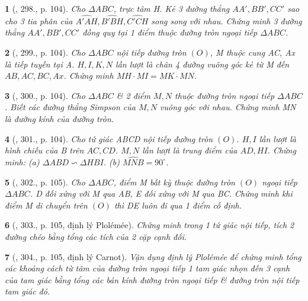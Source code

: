 \documentclass{article}
\newtheorem{baitoan}{}
\begin{document}
\begin{baitoan}[\cite{Binh_Toan_9_tap_2}, 298., p. 104]
	Cho $\Delta ABC$, trực tâm H. Kẻ 3 đường thẳng $AA',BB',CC'$ sao cho 3 tia phân của $\widehat{A'AH},\widehat{B'BH},\widehat{C'CH}$ song song với nhau. Chứng minh 3 đường thẳng $AA',BB',CC'$ đồng quy tại 1 điểm thuộc đường tròn ngoại tiếp $\Delta ABC$.
\end{baitoan}

\begin{baitoan}[\cite{Binh_Toan_9_tap_2}, 299., p. 104]
	Cho $\Delta ABC$ nội tiếp đường tròn $(O)$, M thuộc cung AC, Ax là tiếp tuyến tại A. $H,I,K,N$ lần lượt là chân 4 đường vuông góc kẻ từ M đến $AB,AC,BC,Ax$. Chứng minh $MH\cdot MI = MK\cdot MN$.
\end{baitoan}

\begin{baitoan}[\cite{Binh_Toan_9_tap_2}, 300., p. 104]
	Cho $\Delta ABC$ \& 2 điểm $M,N$ thuộc đường tròn ngoại tiếp $\Delta ABC$. Biết các đường thẳng Simpson của $M,N$ vuông góc với nhau. Chứng minh MN là đường kính của đường tròn.
\end{baitoan}

\begin{baitoan}[\cite{Binh_Toan_9_tap_2}, 301., p. 104]
	Cho tứ giác ABCD nội tiếp đường tròn $(O)$. $H,I$ lần lượt là hình chiếu của B trên $AC,CD$. $M,N$ lần lượt là trung điểm của $AD,HI$. Chứng minh: (a) $\Delta ABD\backsim\Delta HBI$. (b) $\widehat{MNB} = 90^\circ$.
\end{baitoan}

\begin{baitoan}[\cite{Binh_Toan_9_tap_2}, 302., p. 105]
	Cho $\Delta ABC$, điểm M bất kỳ thuộc đường tròn $(O)$ ngoại tiếp $\Delta ABC$. D đối xứng với M qua AB, E đối xứng với M qua BC. Chứng minh khi điểm M di chuyển trên $(O)$ thì DE luôn đi qua 1 điểm cố định.
\end{baitoan}

\begin{baitoan}[\cite{Binh_Toan_9_tap_2}, 303., p. 105, định lý Plol\'em\'ee]
	Chứng minh trong 1 tứ giác nội tiếp, tích 2 đường chéo bằng tổng các tích của 2 cặp cạnh đối.
\end{baitoan}

\begin{baitoan}[\cite{Binh_Toan_9_tap_2}, 304., p. 105, định lý Carnot]
	Vận dụng định lý Plol\'em\'ee để chứng minh tổng các khoảng cách từ tâm của đường tròn ngoại tiếp 1 tam giác nhọn đến 3 cạnh của tam giác bằng tổng các bán kính đường tròn ngoại tiếp \& đường tròn nội tiếp tam giác đó.
\end{baitoan}
\end{document}
